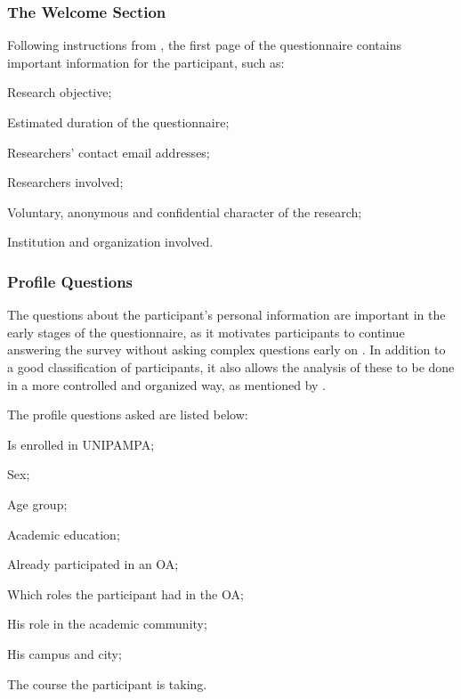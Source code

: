 \subsubsection{The Welcome Section}\label{survey:welcome}

Following instructions from , the first page of the questionnaire contains important information for the participant, such as:

\begin{inparaenum}[(i)]
  \item Research objective;
  \item Estimated duration of the questionnaire;
  \item Researchers' contact email addresses;
  \item Researchers involved;
  \item Voluntary, anonymous and confidential character of the research;
  \item Institution and organization involved.
\end{inparaenum}

\subsubsection{Profile Questions}\label{survey:profile-questions}

The questions about the participant's personal information are important in the early stages of the questionnaire, as it motivates participants to continue answering the survey without asking complex questions early on \cite{LMRea}. In addition to a good classification of participants, it also allows the analysis of these to be done in a more controlled and organized way, as mentioned by .

The profile questions asked are listed below:
\begin{inparaenum}[(1)]
  \item Is enrolled in \ac{UNIPAMPA};
  \item Sex;
  \item Age group;
  \item Academic education;
  \item Already participated in an \ac{OA};
  \item Which roles the participant had in the \ac{OA};
  \item His role in the academic community;
  \item His campus and city;
  \item The course the participant is taking.
\end{inparaenum}

